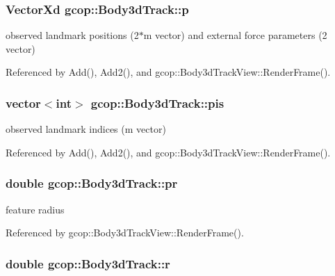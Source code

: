 \subsubsection[{p}]{\setlength{\rightskip}{0pt plus 5cm}\-Vector\-Xd {\bf gcop\-::\-Body3d\-Track\-::p}}\label{classgcop_1_1Body3dTrack_abb80b3ecbdc067d170465d1c652666d5}


observed landmark positions (2$\ast$m vector) and external force parameters (2 vector) 



\-Referenced by \-Add(), \-Add2(), and gcop\-::\-Body3d\-Track\-View\-::\-Render\-Frame().

\subsubsection[{pis}]{\setlength{\rightskip}{0pt plus 5cm}vector$<$int$>$ {\bf gcop\-::\-Body3d\-Track\-::pis}}\label{classgcop_1_1Body3dTrack_a3b2cc8afccc44c8dc16d8ab5350377f6}


observed landmark indices (m vector) 



\-Referenced by \-Add(), \-Add2(), and gcop\-::\-Body3d\-Track\-View\-::\-Render\-Frame().

\subsubsection[{pr}]{\setlength{\rightskip}{0pt plus 5cm}double {\bf gcop\-::\-Body3d\-Track\-::pr}}\label{classgcop_1_1Body3dTrack_ae1ad986a059dd80dcb1aad132e88b18f}


feature radius 



\-Referenced by gcop\-::\-Body3d\-Track\-View\-::\-Render\-Frame().

\subsubsection[{r}]{\setlength{\rightskip}{0pt plus 5cm}double {\bf gcop\-::\-Body3d\-Track\-::r}}\label{classgcop_1_1Body3dTrack_a909b4b213322136c50c9039c3224d905}


